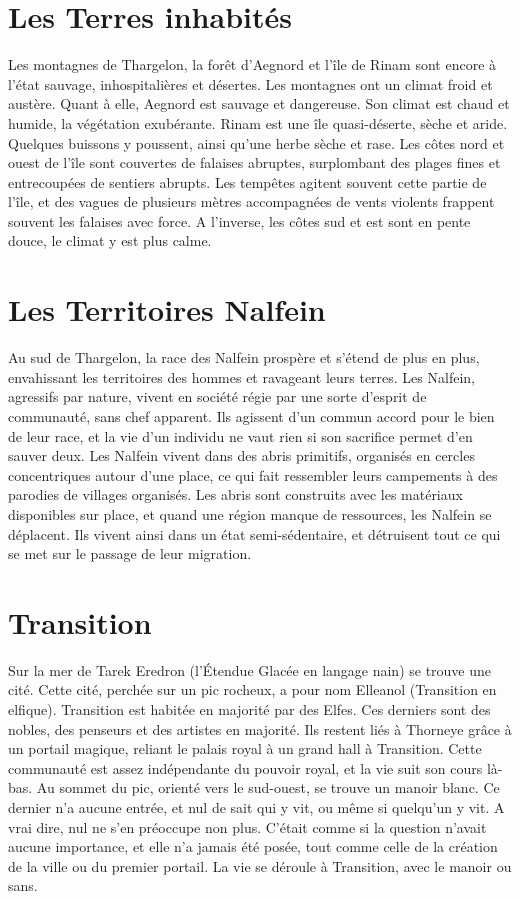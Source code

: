 \section{Les Terres inhabités}
Les montagnes de Thargelon, la forêt d'Aegnord et l'île de Rinam sont encore à l'état sauvage, inhospitalières et désertes. Les montagnes ont un climat froid et austère. Quant à elle, Aegnord est sauvage et dangereuse. Son climat est chaud et humide, la végétation exubérante. 
\newline
Rinam est une île quasi-déserte, sèche et aride. Quelques buissons y poussent, ainsi qu'une herbe sèche et rase. Les côtes nord et ouest de l'île sont couvertes de falaises abruptes, surplombant des plages fines et entrecoupées de sentiers abrupts. Les tempêtes agitent souvent cette partie de l'île, et des vagues de plusieurs mètres accompagnées de vents violents frappent souvent les falaises avec force. A l'inverse, les côtes sud et est sont en pente douce, le climat y est plus calme.
\section{Les Territoires Nalfein}
Au sud de Thargelon, la race des Nalfein prospère et s'étend de plus en plus, envahissant les territoires des hommes et ravageant leurs terres. Les Nalfein, agressifs par nature, vivent en société régie par une sorte d'esprit de communauté, sans chef apparent. Ils agissent d'un commun accord pour le bien de leur race, et la vie d'un individu ne vaut rien si son sacrifice permet d'en sauver deux. Les Nalfein vivent dans des abris primitifs, organisés en cercles concentriques autour d'une place, ce qui fait ressembler leurs campements à des parodies de villages organisés. Les abris sont construits avec les matériaux disponibles sur place, et quand une région manque de ressources, les Nalfein se déplacent. Ils vivent ainsi dans un état semi-sédentaire, et détruisent tout ce qui se met sur le passage de leur migration.
\section{Transition}
Sur la mer de Tarek Eredron (l'Étendue Glacée en langage nain) se trouve une cité. Cette cité, perchée sur un pic rocheux, a pour nom Elleanol (Transition en elfique). Transition est habitée en majorité par des Elfes. Ces derniers sont des nobles, des penseurs et des artistes en majorité. Ils restent liés à Thorneye grâce à un portail magique, reliant le palais royal à un grand hall à Transition. Cette communauté est assez indépendante du pouvoir royal, et la vie suit son cours là-bas.
\newline
Au sommet du pic, orienté vers le sud-ouest, se trouve un manoir blanc. Ce dernier n'a aucune entrée, et nul de sait qui y vit, ou même si quelqu'un y vit. A vrai dire, nul ne s'en préoccupe non plus. C'était comme si la question n'avait aucune importance, et elle n'a jamais été posée, tout comme celle de la création de la ville ou du premier portail. La vie se déroule à Transition, avec le manoir ou sans.